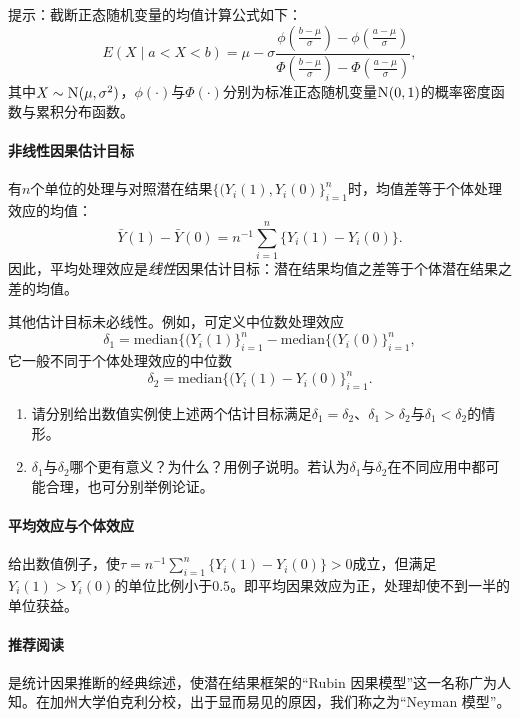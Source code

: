 提示：截断正态随机变量的均值计算公式如下：
$$
E(X\mid   a < X < b ) = \mu - \sigma \frac{   \phi \left(  \frac{b-\mu}{\sigma} \right )   -  \phi \left(  \frac{a-\mu}{\sigma} \right )   }
{   \Phi \left(  \frac{b-\mu}{\sigma} \right )   -  \Phi \left(  \frac{a-\mu}{\sigma} \right )   } , 
$$
其中$X \sim \textsc{N}(\mu, \sigma^2)$，$\phi(\cdot)$与$\Phi(\cdot)$分别为标准正态随机变量$\textsc{N}(0,1)$的概率密度函数与累积分布函数。 



\paragraph{非线性因果估计目标}
\label{hw::nonlinear-causal-estimands}



有$n$个单位的处理与对照潜在结果$\{  (Y_i(1), Y_i(0) \}_{i=1}^n$时，均值差等于个体处理效应的均值：
$$
\bar{Y}(1) - \bar{Y}(0) = n^{-1} \sum_{i=1}^n  \{ Y_i(1) - Y_i(0) \}.
$$
因此，平均处理效应是{\it 线性}因果估计目标：潜在结果均值之差等于个体潜在结果之差的均值。 


其他估计目标未必线性。例如，可定义中位数处理效应
$$
\delta_1 = \text{median}\{  (Y_i(1) \}_{i=1}^n - \text{median}\{  (Y_i(0) \}_{i=1}^n,
$$
它一般不同于个体处理效应的中位数
$$
\delta_2 = \text{median}\{  (Y_i(1) - Y_i(0) \}_{i=1}^n .
$$

\begin{enumerate}
\item
请分别给出数值实例使上述两个估计目标满足$\delta_1 = \delta_2$、$\delta_1 > \delta_2$与$\delta_1 < \delta_2$的情形。


\item
$\delta_1$与$\delta_2$哪个更有意义？为什么？用例子说明。若认为$\delta_1$与$\delta_2$在不同应用中都可能合理，也可分别举例论证。 
\end{enumerate}




\paragraph{平均效应与个体效应}

给出数值例子，使$\tau = n^{-1} \sum_{i=1}^n  \{ Y_i(1) - Y_i(0) \}  >0$成立，但满足$Y_i(1) > Y_i(0)$的单位比例小于$0.5$。即平均因果效应为正，处理却使不到一半的单位获益。 


\paragraph{推荐阅读}

\citet{holland1986statistics}是统计因果推断的经典综述，使潜在结果框架的“Rubin 因果模型”这一名称广为人知。在加州大学伯克利分校，出于显而易见的原因，我们称之为“Neyman 模型”。  


